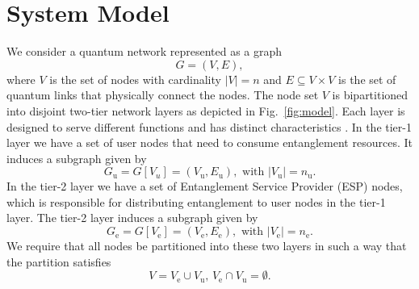 \documentclass[conference]{IEEEtran}
\begin{document}
\section{System Model}\label{system_model}
We consider a quantum network represented as a graph
\begin{equation}
    G = (V, E),
\end{equation}
where $V$ is the set of nodes with cardinality $|V|=n$ and $E \subseteq V\times V$ is the set of quantum links that physically connect the nodes. The node set $V$ is bipartitioned into disjoint two-tier network layers as depicted in Fig.~\ref{fig:model}. Each layer is designed to serve different functions and has distinct characteristics \cite{11322738}.
In the tier-1 layer we have a set of user nodes that need to consume entanglement resources. It induces a subgraph given by
\begin{equation}
    G_\mathrm{u}=G[V_u]=(V_\mathrm{u}, E_\mathrm{u}), \text{ with } |V_\mathrm{u}|=n_\mathrm{u}.
\end{equation}
In the tier-2 layer we have a set of Entanglement Service Provider (ESP) nodes, which is responsible for distributing entanglement to user nodes in the tier-1 layer. The tier-2 layer induces a subgraph given by
\begin{equation}
    G_\mathrm{e}=G[V_\mathrm{e}]=(V_\mathrm{e}, E_\mathrm{e}), \text{ with } |V_\mathrm{e}|=n_\mathrm{e}.
\end{equation}
We require that all nodes be partitioned into these two layers in such a way that the partition satisfies
\begin{equation}
    V = V_\mathrm{e} \cup V_\mathrm{u}, \, V_\mathrm{e} \cap V_\mathrm{u} = \emptyset. %
\end{equation}
\end{document}
